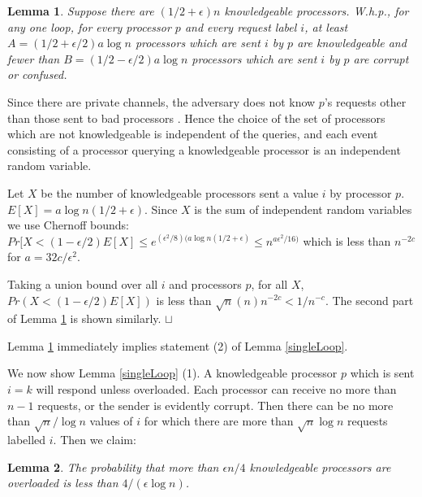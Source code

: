 \documentclass[letterpaper,11pt]{article}
\newtheorem{lemma}{Lemma}
\newcommand{\sq}{\hbox{\rlap{$\sqcap$}$\sqcup$}}
\newcommand{\qed}{\hspace*{\fill}\sq}
\newenvironment{proof}{\noindent {\bf Proof:}}{\qed\par\vskip 4mm\par}
\begin{document}
 \begin{lemma} \label{requests} Suppose there are $(1/2+ \epsilon) n $ knowledgeable processors.  W.h.p., for any one loop, for every processor $p$ and every request label $i$,
 at least $A=(1/2+ \epsilon/2) a \log n$ processors which are sent $i$ by $p$ are knowledgeable and fewer than $B=(1/2 - \epsilon/2)a \log n$ processors which are sent  $i$ by $p$ are corrupt or confused.
 
 \end{lemma}
 \begin{proof}
 Since there are private channels, the adversary does not know $p$'s requests other than those sent to bad processors .  Hence the choice of the set  of processors which are not knowledgeable is independent of the queries,  and each  event  consisting of a processor querying a knowledgeable processor is an independent random variable. 
 
 Let $X$ be the number of knowledgeable processors sent a value $i$ by processor $p$. $E[X]= a\log n (1/2 + \epsilon)$.
 Since $X$ is the sum of independent random variables we use
 Chernoff bounds:  $Pr[X < (1- \epsilon/2) E[X] \leq e^{(\epsilon^2/8)( a\log n (1/2 + \epsilon)}\leq n^{a\epsilon^2/16)}$ which is less than 
 $n^{-2c}$ for $a= 32c/\epsilon^2$.
 
Taking a union bound over all $i$ and  processors $p$,  for all $X$,  $Pr(X<   (1- \epsilon/2) E[X] )$
is less than $\sqrt{n}(n)n^{-2c} < 1/n^{-c}$. The second part of Lemma \ref{requests} is shown similarly.
\end{proof}

Lemma \ref{requests} immediately implies statement (2) of Lemma \ref{singleLoop}.


We now show Lemma \ref{singleLoop} (1). A knowledgeable processor $p$ which is sent $i=k$ will respond unless overloaded. Each processor can receive no more than $n-1$ requests, or the sender is evidently corrupt.
Then there can be no more than  $\sqrt{n}/\log n$ values of  $i$ for which there are more than  $\sqrt{n} \log  n$ requests labelled $i$. Then we claim:

 
 \begin{lemma}\label{overload}
The probability that more than $\epsilon n/4 $ knowledgeable processors are overloaded is less than $4/(\epsilon \log n)$.
\end{lemma}
\end{document}
